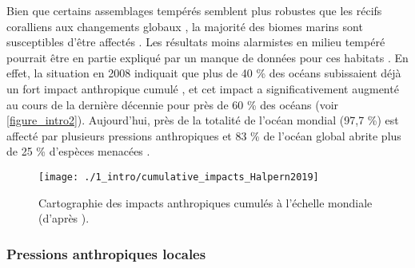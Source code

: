 Bien que certains assemblages tempérés semblent plus robustes que les récifs coralliens aux changements globaux \citep{stuart-smith_stability_2010}, la majorité des biomes marins sont susceptibles d’être affectés \citep{waycott_accelerating_2009, marba_mediterranean_2014, telesca_seagrass_2015, wernberg_climate-driven_2016, halpern_recent_2019, ohara_mapping_2019}. Les résultats moins alarmistes en milieu tempéré pourrait être en partie expliqué par un manque de données pour ces habitats \citep{wernberg_impacts_2011}. En effet, la situation en 2008 indiquait que plus de 40 \% des océans subissaient déjà un fort impact anthropique cumulé \citep{halpern_global_2008}, et cet impact a significativement augmenté au cours de la dernière décennie pour près de 60 \% des océans \citep{halpern_recent_2019} (voir \autoref{figure_intro2}). Aujourd’hui, près de la totalité de l’océan mondial (97,7 \%) est affecté par plusieurs pressions anthropiques \citep{halpern_spatial_2015} et 83 \% de l’océan global abrite plus de 25 \% d’espèces menacées \citep{ohara_mapping_2019}.


\begin{figure}[H]
	\begin{center}
	\texttt{[image: ./1\_intro/cumulative\_impacts\_Halpern2019]}
		\caption[Cartographie des impacts anthropiques cumulés à l’échelle mondiale]{Cartographie des impacts anthropiques cumulés à l’échelle mondiale (d'après \citet{halpern_recent_2019}).}
	\label{figure_intro2}
\end{center}
\end{figure}

\subsubsection{Pressions anthropiques locales}\label{intro.1.2.2}

